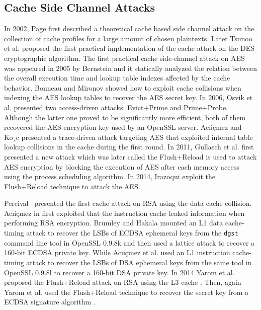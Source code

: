 \subsection{Cache Side Channel Attacks}
In 2002, Page \cite{Page2002} first described a theoretical cache based side channel attack on the collection of cache profiles for a large amount of chosen plaintexts.
Later Tsunoo et al. \cite{Tsunoo2003Cryptanalysis} proposed the first practical implementation of the cache attack on the DES cryptographic algorithm.
The first practical cache side-channel attack on AES was appeared in 2005 by Bernstein \cite{Bernstein2005Cache}
 and it statically analyzed the relation between the overall execution time and lookup table indexes affected by the cache behavior.
Bonneau and Mironov \cite{Bonneau2006} showed how to exploit cache collisions when indexing the AES lookup tables to recover the  AES secret key.
In 2006, Osvik et al. \cite{Osvik2006} presented two access-driven attacks: Evict+Prime and Prime+Probe.
Although the latter one proved to be significantly more efficient, both of them recovered the AES encryption key used by an OpenSSL server.
 Ac{\i}i{\c{c}}mez and Ko¸c \cite{ac2006} presented a trace-driven attack targeting AES that exploited internal table lookup collisions in the cache during the first round.
In 2011, Gullasch et al. \cite{cachegame2011} first presented a new attack which was later called the Flush+Reload is used to attack AES encryption by blocking the execution of AES after each memory access using the process scheduling algorithm.
In 2014, Irazoqui \cite{Irazoqui2014} exploit the Flush+Reload technique to attack the AES.

Percival~\cite{Percival2005CACHEMF} presented the first cache attack on RSA using the data cache collision.
Ac{\i}i{\c{c}}mez in \cite{Onur2007Yet} first exploited that the instruction cache leaked information when performing RSA encryption.
Brumley and Hakala \cite{Brumley2009} mounted an L1 data cache-timing attack to recover the LSBs of ECDSA ephemeral keys from the \verb+dgst+ command line tool in OpenSSL 0.9.8k and then used a lattice attack to recover a 160-bit ECDSA private key.
 While Ac{\i}i{\c{c}}mez et al. \cite{Brumley2010} used an L1 instruction cache-timing attack to recover the LSBs of DSA ephemeral keys from the same tool in OpenSSL 0.9.8l to recover a 160-bit DSA private key.
 In 2014 Yarom et al. proposed the Flush+Reload attack on RSA using the L3 cache \cite{flushreload}.
  Then, again Yarom et al. used the Flush+Reload technique to recover the secret key from a ECDSA signature algorithm \cite{yarom2014recovering}.

